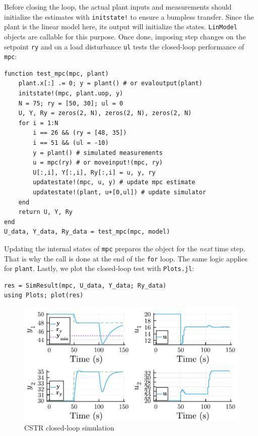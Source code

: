 Before closing the loop, the actual plant inputs and measurements should initialize the estimates with \texttt{initstate!} to ensure a bumpless transfer. Since the plant is the linear model here, its output will initialize the states. \texttt{LinModel} objects are callable for this purpose. Once done, imposing step changes on the setpoint \texttt{ry} and on a load disturbance \texttt{ul} tests the closed-loop performance of \texttt{mpc}:
\begin{verbatim}
function test_mpc(mpc, plant)
    plant.x[:] .= 0; y = plant() # or evaloutput(plant)
    initstate!(mpc, plant.uop, y)
    N = 75; ry = [50, 30]; ul = 0
    U, Y, Ry = zeros(2, N), zeros(2, N), zeros(2, N)
    for i = 1:N
        i == 26 && (ry = [48, 35])
        i == 51 && (ul = -10)
        y = plant() # simulated measurements
        u = mpc(ry) # or moveinput!(mpc, ry)
        U[:,i], Y[:,i], Ry[:,i] = u, y, ry
        updatestate!(mpc, u, y) # update mpc estimate
        updatestate!(plant, u+[0,ul]) # update simulator
    end
    return U, Y, Ry
end
U_data, Y_data, Ry_data = test_mpc(mpc, model)
\end{verbatim}
Updating the internal states of \texttt{mpc} prepares the object for the \emph{next} time step. That is why the call is done at the end of the \texttt{for} loop. The same logic applies for \texttt{plant}. Lastly, we plot the closed-loop test with \texttt{Plots.jl}:
\begin{verbatim}
res = SimResult(mpc, U_data, Y_data; Ry_data)
using Plots; plot(res)
\end{verbatim}

\begin{figure}[h]
    \centering
    \includegraphics[width=\columnwidth]{fig/plot_LinMPC1.pdf}
    \caption{CSTR closed-loop simulation}
    \label{fig:plot_LinMPC1}
\end{figure}

